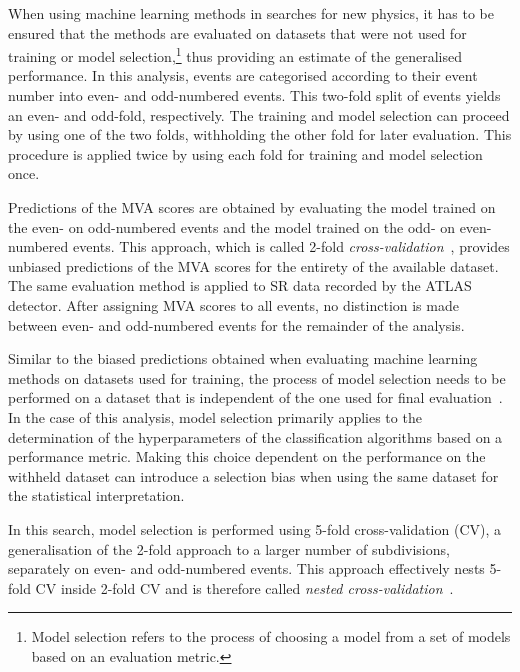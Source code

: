 When using machine learning methods in searches for new physics, it has to be
ensured that the methods are evaluated on datasets that were not used for
training or model selection,\footnote{Model selection refers to the process of
  choosing a model from a set of models based on an evaluation metric.} thus
providing an estimate of the generalised performance. In this analysis, events
are categorised according to their event number into even- and odd-numbered
events. This two-fold split of events yields an even- and odd-fold,
respectively. The training and model selection can proceed by using one of the
two folds, withholding the other fold for later evaluation. This procedure is
applied twice by using each fold for training and model selection once.

Predictions of the MVA scores are obtained by evaluating the model
trained on the even- on odd-numbered events and the model trained on
the odd- on even-numbered events. This approach, which is called
2-fold \emph{cross-validation}~\cite{hastie09,bishop06}, provides
unbiased predictions of the MVA scores for the entirety of the
available dataset. The same evaluation method is applied to SR
data recorded by the ATLAS detector. After assigning MVA scores
to all events, no distinction is made between even- and odd-numbered
events for the remainder of the analysis.


Similar to the biased predictions obtained when evaluating machine
learning methods on datasets used for training, the process of model
selection needs to be performed on a dataset that is independent of
the one used for final evaluation~\cite{cawley10}. In the case of this
analysis, model selection primarily applies to the determination of
the hyperparameters of the classification algorithms based on a
performance metric. Making this choice dependent on the performance on
the withheld dataset can introduce a selection bias when using the
same dataset for the statistical interpretation.

In this search, model selection is performed using 5-fold
cross-validation (CV), a generalisation of the 2-fold approach to a
larger number of subdivisions, separately on even- and odd-numbered
events. This approach effectively nests 5-fold CV inside 2-fold CV and
is therefore called \emph{nested
  cross-validation}~\cite{cawley10,stone74}.

